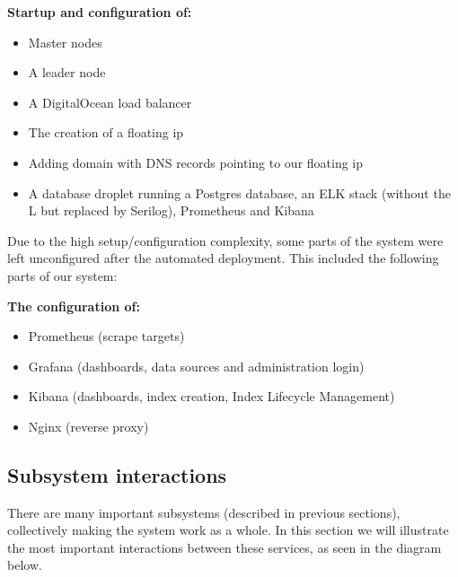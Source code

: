   \textbf{Startup and configuration of:}
  \begin{itemize}
    \item Master nodes
    \item A leader node
    \item A DigitalOcean load balancer
    \item The creation of a floating ip
    \item Adding domain with DNS records pointing to our floating ip
    \item A database droplet running a Postgres database, an ELK stack (without the L but replaced by Serilog), Prometheus and Kibana
  \end{itemize}
  
  Due to the high setup/configuration complexity, some parts of the system were left unconfigured after the automated deployment.
  This included the following parts of our system:\newline
  
  \textbf{The configuration of:}
  \begin{itemize}
    \item Prometheus (scrape targets)
    \item Grafana (dashboards, data sources and administration login)
    \item Kibana (dashboards, index creation, Index Lifecycle Management)
    \item Nginx (reverse proxy)
  \end{itemize}
  
  

  \subsection{Subsystem interactions}
  There are many important subsystems (described in previous sections), collectively making the system work as a whole.
  In this section we will illustrate the most important interactions between these services, as seen in the diagram below.\newline

\newpage

